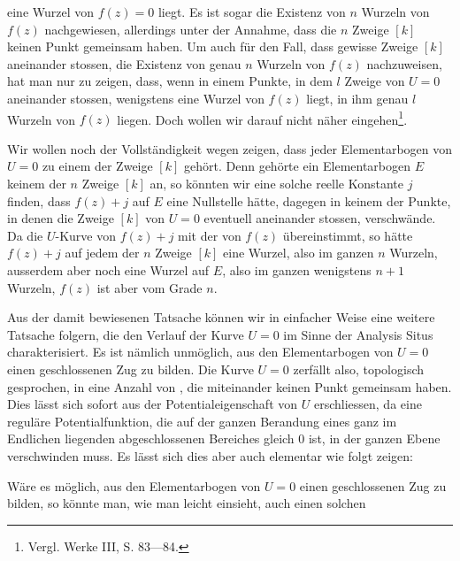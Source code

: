 eine Wurzel von \(f(z)=0\) liegt. Es ist sogar die Existenz von \(n\) Wurzeln
von \(f(z)\) nachgewiesen, allerdings unter der Annahme, dass die \(n\) Zweige \([k]\)
keinen Punkt gemeinsam haben. Um auch für den Fall, dass gewisse Zweige
\([k]\) aneinander stossen, die Existenz von genau \(n\) Wurzeln von \(f(z)\) nachzuweisen,
hat man nur zu zeigen, dass, wenn in einem Punkte, in dem \(l\) Zweige
von \(U=0\) aneinander stossen, wenigstens eine Wurzel von \(f(z)\) liegt, in ihm
genau \(l\) Wurzeln von \(f(z)\) liegen. Doch wollen wir darauf nicht näher eingehen\footnote[3]{Vergl. Werke III, S. 83—84.}.
\par\clearpage{}
\noindent\hspace*{\parindent} Wir wollen noch
der Vollständigkeit wegen zeigen, dass jeder Elementarbogen von \(U=0\) zu
einem der Zweige \([k]\) gehört. Denn gehörte ein Elementarbogen \(E\) keinem
der \(n\) Zweige \([k]\) an, so könnten wir eine solche reelle Konstante \(j\) finden,
dass \(f(z)+j\) auf \(E\) eine Nullstelle hätte, dagegen in keinem der Punkte, in
denen die Zweige \([k]\) von \(U=0\) eventuell aneinander stossen, verschwände.
Da die \(U\)-Kurve von \(f(z)+j\) mit der von \(f(z)\) übereinstimmt, so hätte \(f(z)+j\)
auf jedem der \(n\) Zweige \([k]\) eine Wurzel, also im ganzen \(n\) Wurzeln, ausserdem
aber noch eine Wurzel auf \(E\), also im ganzen wenigstens \(n+1\) Wurzeln,
\(f(z)\) ist aber vom Grade \(n\).
\par
Aus der damit bewiesenen Tatsache können wir in einfacher Weise eine
weitere Tatsache folgern, die den Verlauf der Kurve \(U=0\) im Sinne der
Analysis Situs charakterisiert. Es ist nämlich unmöglich, aus den Elementarbogen
von \(U=0\) einen geschlossenen Zug zu bilden. Die Kurve \(U=0\)
zerfällt also, topologisch gesprochen, in eine Anzahl von , die miteinander
keinen Punkt gemeinsam haben. Dies lässt sich sofort aus der Potentialeigenschaft
von \(U\) erschliessen, da eine reguläre Potentialfunktion, die
auf der ganzen Berandung eines ganz im Endlichen liegenden abgeschlossenen
Bereiches gleich \(0\) ist, in der ganzen Ebene verschwinden muss. Es lässt sich
dies aber auch elementar wie folgt zeigen:
\par
Wäre es möglich, aus den Elementarbogen von \(U=0\) einen geschlossenen
Zug zu bilden, so könnte man, wie man leicht einsieht, auch einen solchen
